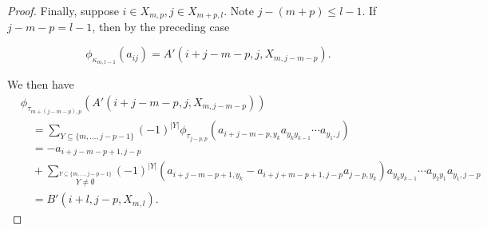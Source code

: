 \documentclass[11pt]{amsart}
\def\t{{\tau}}
\def\k{{\kappa}}
\theoremstyle{definition}
\begin{document}
\begin{proof}
%

Finally, suppose $i\in X_{m,p},j\in X_{m+p,l}$. Note $j-(m+p)\le l-1$. If $j-m-p=l-1$, then by the preceding case

$$\phi_{\k_{m,l-1}}(a_{ij}) = A'(i+j-m-p,j,X_{m,j-m-p}).$$

We then have
{\small
\begin{align*}
&\phi_{\tau_{m + (j-m-p),p}}(A'(i+j-m-p,j,X_{m,j-m-p}))\\
&\quad =\sum_{{\scriptscriptstyle Y\subseteq \{m,\ldots,j - p - 1\}}} (-1)^{|Y|} \phi_{\t_{j-p,p}}(a_{i+j-m-p,y_k}a_{y_ky_{k-1}}\cdots a_{y_1,j})\\
&\quad = -a_{i+j-m-p+1,j-p}\\
&\quad + \sum_{{\scriptscriptstyle \overset{Y\subseteq \{m,\ldots,j - p - 1\}}{Y\ne\emptyset}}} (-1)^{|Y|} (a_{i+j-m-p+1,y_k} -a_{i+j+m-p+1,j-p}a_{j-p,y_k})a_{y_ky_{k-1}}\cdots a_{y_2y_1}a_{y_1,j-p}\\
&\quad = B'(i+l,j-p,X_{m,l}).
\end{align*}
}


\end{proof}
\end{document}
